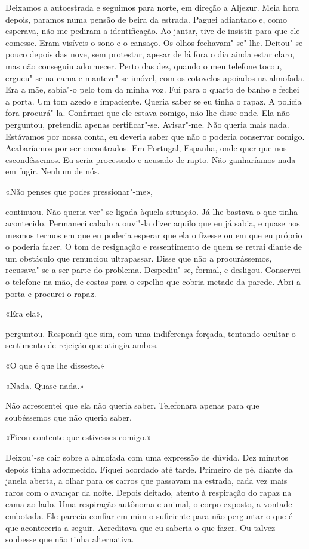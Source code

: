 Deixamos a autoestrada e seguimos para norte, em direção a Aljezur.
Meia hora depois, paramos numa pensão de beira da estrada. Paguei
adiantado e, como esperava, não me pediram a identificação. Ao jantar,
tive de insistir para que ele comesse. Eram visíveis o sono e o cansaço.
Os olhos fechavam"-se"-lhe. Deitou"-se pouco depois das nove, sem
protestar, apesar de lá fora o dia ainda estar claro, mas não conseguiu
adormecer. Perto das dez, quando o meu telefone tocou, ergueu"-se na
cama e manteve"-se imóvel, com os cotovelos apoiados na almofada. Era a
mãe, sabia"-o pelo tom da minha voz. Fui para o quarto de banho e fechei
a porta. Um tom azedo e impaciente. Queria saber se eu tinha o rapaz. A
polícia fora procurá"-la. Confirmei que ele estava comigo, não lhe disse
onde. Ela não perguntou, pretendia apenas certificar"-se. Avisar"-me.
Não queria mais nada. Estávamos por nossa conta, eu deveria saber que
não o poderia conservar comigo. Acabaríamos por ser encontrados. Em
Portugal, Espanha, onde quer que nos escondêssemos. Eu seria processado
e acusado de rapto. Não ganharíamos nada em fugir. Nenhum de nós.

«Não penses que podes pressionar"-me»,

continuou. Não queria ver"-se ligada àquela situação. Já lhe bastava o
que tinha acontecido. Permaneci calado a ouvi"-la dizer aquilo que eu já
sabia, e quase nos mesmos termos em que eu poderia esperar que ela o
fizesse ou em que eu próprio o poderia fazer. O tom de resignação e
ressentimento de quem se retrai diante de um obstáculo que renunciou
ultrapassar. Disse que não a procurássemos, recusava"-se a ser parte do
problema. Despediu"-se, formal, e desligou. Conservei o telefone na mão,
de costas para o espelho que cobria metade da parede. Abri a porta e
procurei o rapaz.

«Era ela»,

perguntou. Respondi que sim, com uma indiferença forçada, tentando
ocultar o sentimento de rejeição que atingia ambos.

«O que é que lhe disseste.»

«Nada. Quase nada.»

Não acrescentei que ela não queria saber. Telefonara apenas para que
soubéssemos que não queria saber.

«Ficou contente que estivesses comigo.»

Deixou"-se cair sobre a almofada com uma expressão de dúvida. Dez
minutos depois tinha adormecido. Fiquei acordado até tarde. Primeiro de
pé, diante da janela aberta, a olhar para os carros que passavam na
estrada, cada vez mais raros com o avançar da noite. Depois deitado,
atento à respiração do rapaz na cama ao lado. Uma respiração autônoma e
animal, o corpo exposto, a vontade embotada. Ele parecia confiar em mim
o suficiente para não perguntar o que é que aconteceria a seguir.
Acreditava que eu saberia o que fazer. Ou talvez soubesse que não tinha
alternativa.

